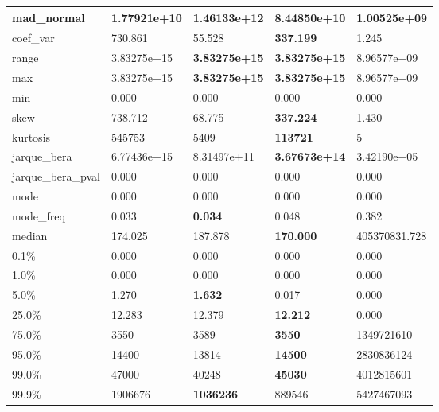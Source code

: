 \begin{table}[H]
\begin{tabular}{|l|m{10em}|m{10em}|m{10em}|m{10em}|}
\hline mad\_normal & 1.77921e+10 & \cellcolor[rgb]{0.9, 0.54, 0.52} 1.46133e+12 & 8.44850e+10 & \bfseries 1.00525e+09 \\
\hline coef\_var & 730.861 & 55.528 & \bfseries 337.199 & \cellcolor[rgb]{0.9, 0.54, 0.52} 1.245 \\
\hline range & 3.83275e+15 & \bfseries 3.83275e+15 & \bfseries 3.83275e+15 & \cellcolor[rgb]{0.9, 0.54, 0.52} 8.96577e+09 \\
\hline max & 3.83275e+15 & \bfseries 3.83275e+15 & \bfseries 3.83275e+15 & \cellcolor[rgb]{0.9, 0.54, 0.52} 8.96577e+09 \\
\hline min & 0.000 & 0.000 & 0.000 & 0.000 \\
\hline skew & 738.712 & 68.775 & \bfseries 337.224 & \cellcolor[rgb]{0.9, 0.54, 0.52} 1.430 \\
\hline kurtosis & 545753 & 5409 & \bfseries 113721 & \cellcolor[rgb]{0.9, 0.54, 0.52} 5 \\
\hline jarque\_bera & 6.77436e+15 & 8.31497e+11 & \bfseries 3.67673e+14 & \cellcolor[rgb]{0.9, 0.54, 0.52} 3.42190e+05 \\
\hline jarque\_bera\_pval & 0.000 & 0.000 & 0.000 & 0.000 \\
\hline mode & 0.000 & 0.000 & 0.000 & 0.000 \\
\hline mode\_freq & 0.033 & \bfseries 0.034 & 0.048 & \cellcolor[rgb]{0.9, 0.54, 0.52} 0.382 \\
\hline median & 174.025 & 187.878 & \bfseries 170.000 & \cellcolor[rgb]{0.9, 0.54, 0.52} 405370831.728 \\
\hline 0.1\% & 0.000 & 0.000 & 0.000 & 0.000 \\
\hline 1.0\% & 0.000 & 0.000 & 0.000 & 0.000 \\
\hline 5.0\% & 1.270 & \bfseries 1.632 & 0.017 & \cellcolor[rgb]{0.9, 0.54, 0.52} 0.000 \\
\hline 25.0\% & 12.283 & 12.379 & \bfseries 12.212 & \cellcolor[rgb]{0.9, 0.54, 0.52} 0.000 \\
\hline 75.0\% & 3550 & 3589 & \bfseries 3550 & \cellcolor[rgb]{0.9, 0.54, 0.52} 1349721610 \\
\hline 95.0\% & 14400 & 13814 & \bfseries 14500 & \cellcolor[rgb]{0.9, 0.54, 0.52} 2830836124 \\
\hline 99.0\% & 47000 & 40248 & \bfseries 45030 & \cellcolor[rgb]{0.9, 0.54, 0.52} 4012815601 \\
\hline 99.9\% & 1906676 & \bfseries 1036236 & 889546 & \cellcolor[rgb]{0.9, 0.54, 0.52} 5427467093 \\
\hline
\end{tabular}
\end{table}

